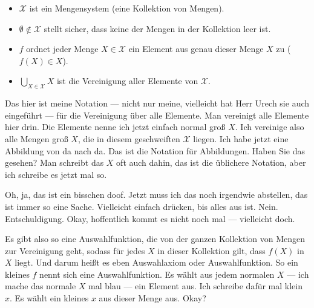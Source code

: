 \begin{math-stroke}

\begin{explanation-of-steps}
\begin{itemize}
    \item $\mathcal{X}$ ist ein Mengensystem (eine Kollektion von Mengen).
    \item $\emptyset \notin \mathcal{X}$ stellt sicher, dass keine der Mengen in der Kollektion leer ist.
    \item $f$ ordnet jeder Menge $X \in \mathcal{X}$ ein Element aus genau dieser Menge $X$ zu ($f(X) \in X$).
    \item $\bigcup_{X \in \mathcal{X}} X$ ist die Vereinigung aller Elemente von $\mathcal{X}$.
\end{itemize}
\end{explanation-of-steps}
\end{math-stroke}

\begin{spoken-clean}[00:12:30 - 00:13:50]
Das hier ist meine Notation --- nicht nur meine, vielleicht hat Herr Urech sie auch eingeführt --- für die Vereinigung über alle Elemente. Man vereinigt alle Elemente hier drin. Die Elemente nenne ich jetzt einfach normal groß $X$. Ich vereinige also alle Mengen groß $X$, die in diesem geschweiften $\mathcal{X}$ liegen. Ich habe jetzt eine Abbildung von da nach da. Das ist die Notation für Abbildungen. Haben Sie das gesehen? Man schreibt das $X$ oft auch dahin, das ist die üblichere Notation, aber ich schreibe es jetzt mal so.

Oh, ja, das ist ein bisschen doof. Jetzt muss ich das noch irgendwie abstellen, das ist immer so eine Sache. Vielleicht einfach drücken, bis alles aus ist. Nein. Entschuldigung. Okay, hoffentlich kommt es nicht noch mal --- vielleicht doch.

Es gibt also so eine Auswahlfunktion, die von der ganzen Kollektion von Mengen zur Vereinigung geht, sodass für jedes $X$ in dieser Kollektion gilt, dass $f(X)$ in $X$ liegt. Und darum heißt es eben Auswahlaxiom oder Auswahlfunktion. So ein kleines $f$ nennt sich eine Auswahlfunktion. Es wählt aus jedem normalen $X$ --- ich mache das normale $X$ mal blau --- ein Element aus. Ich schreibe dafür mal klein $x$. Es wählt ein kleines $x$ aus dieser Menge aus. Okay?
\end{spoken-clean}

